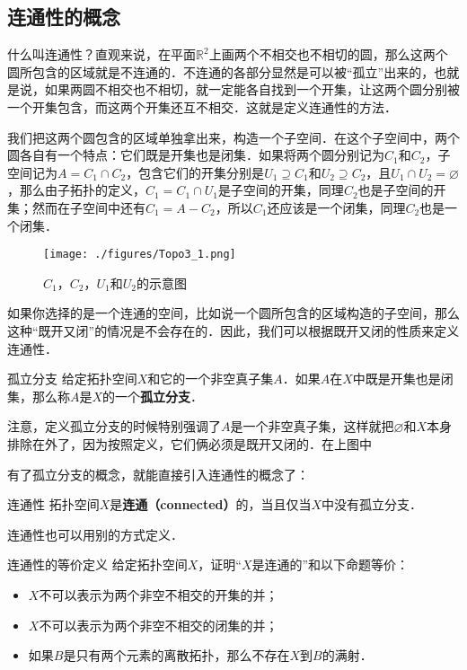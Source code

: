 
\subsection{连通性的概念}
什么叫连通性？直观来说，在平面$\mathbb{R}^2$上画两个不相交也不相切的圆，那么这两个圆所包含的区域就是不连通的．不连通的各部分显然是可以被“孤立”出来的，也就是说，如果两圆不相交也不相切，就一定能各自找到一个开集，让这两个圆分别被一个开集包含，而这两个开集还互不相交．这就是定义连通性的方法．

我们把这两个圆包含的区域单独拿出来，构造一个子空间．在这个子空间中，两个圆各自有一个特点：它们既是开集也是闭集．如果将两个圆分别记为$C_1$和$C_2$，子空间记为$A=C_1\cap C_2$，包含它们的开集分别是$U_1\supseteq C_1$和$U_2\supseteq C_2$，且$U_1\cap U_2=\varnothing$，那么由子拓扑的定义，$C_1=C_1\cap U_1$是子空间的开集，同理$C_2$也是子空间的开集；然而在子空间中还有$C_1=A-C_2$，所以$C_1$还应该是一个闭集，同理$C_2$也是一个闭集．

\begin{figure}[ht]
\centering
\texttt{[image: ./figures/Topo3\_1.png]}
\caption{$C_1$，$C_2$，$U_1$和$U_2$的示意图} \label{Topo3_fig1}
\end{figure}

如果你选择的是一个连通的空间，比如说一个圆所包含的区域构造的子空间，那么这种“既开又闭”的情况是不会存在的．因此，我们可以根据既开又闭的性质来定义连通性．

\begin{definition}{孤立分支}
给定拓扑空间$X$和它的一个非空真子集$A$．如果$A$在$X$中既是开集也是闭集，那么称$A$是$X$的一个\textbf{孤立分支}．
\end{definition}

注意，定义孤立分支的时候特别强调了$A$是一个非空真子集，这样就把$\varnothing$和$X$本身排除在外了，因为按照定义，它们俩必须是既开又闭的．在上图中

有了孤立分支的概念，就能直接引入连通性的概念了：

\begin{definition}{连通性}
拓扑空间$X$是\textbf{连通（connected）}的，当且仅当$X$中没有孤立分支．
\end{definition}

连通性也可以用别的方式定义．

\begin{exercise}{连通性的等价定义}\label{Topo3_exe1}
给定拓扑空间$X$，证明“$X$是连通的”和以下命题等价：
\begin{itemize}
\item $X$不可以表示为两个非空不相交的开集的并；
\item $X$不可以表示为两个非空不相交的闭集的并；
\item 如果$B$是只有两个元素的离散拓扑，那么不存在$X$到$B$的满射．

\end{itemize}
\end{exercise}

